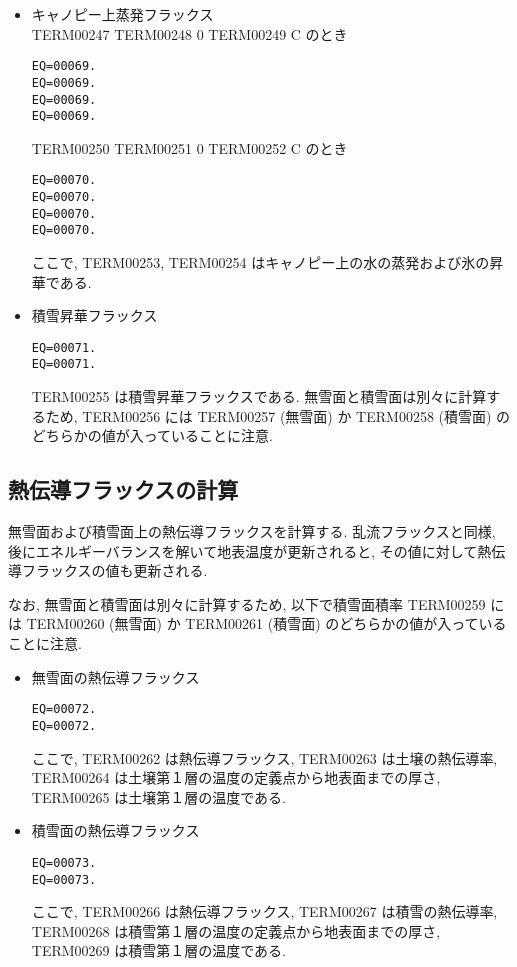 \begin{itemize}
\item キャノピー上蒸発フラックス \\
%
TERM00247 TERM00248 0 TERM00249 C のとき
 \begin{verbatim}
EQ=00069.
EQ=00069.
EQ=00069.
EQ=00069.
\end{verbatim}
TERM00250 TERM00251 0 TERM00252 C のとき
 \begin{verbatim}
EQ=00070.
EQ=00070.
EQ=00070.
EQ=00070.
\end{verbatim}
ここで, TERM00253, TERM00254 はキャノピー上の水の蒸発および氷の昇
華である.

\item 積雪昇華フラックス
 \begin{verbatim}
EQ=00071.
EQ=00071.
\end{verbatim}
TERM00255 は積雪昇華フラックスである.
無雪面と積雪面は別々に計算するため, TERM00256 には TERM00257 (無雪面) か TERM00258
(積雪面) のどちらかの値が入っていることに注意.
\end{itemize}

\subsection{熱伝導フラックスの計算}

無雪面および積雪面上の熱伝導フラックスを計算する. 乱流フラックスと同様,
後にエネルギーバランスを解いて地表温度が更新されると, その値に対して熱伝
導フラックスの値も更新される.

なお, 無雪面と積雪面は別々に計算するため, 以下で積雪面積率 TERM00259 には
TERM00260 (無雪面) か TERM00261 (積雪面) のどちらかの値が入っていることに注意.

\begin{itemize}
 \item 無雪面の熱伝導フラックス
\begin{verbatim}
EQ=00072.
EQ=00072.
\end{verbatim}
ここで, TERM00262 は熱伝導フラックス, TERM00263 は土壌の熱伝導率,
TERM00264 は土壌第１層の温度の定義点から地表面までの厚さ,
TERM00265 は土壌第１層の温度である.
 \item 積雪面の熱伝導フラックス
\begin{verbatim}
EQ=00073.
EQ=00073.
\end{verbatim}
ここで, TERM00266 は熱伝導フラックス, TERM00267 は積雪の熱伝導率,
TERM00268 は積雪第１層の温度の定義点から地表面までの厚さ,
TERM00269 は積雪第１層の温度である.
\end{itemize}

